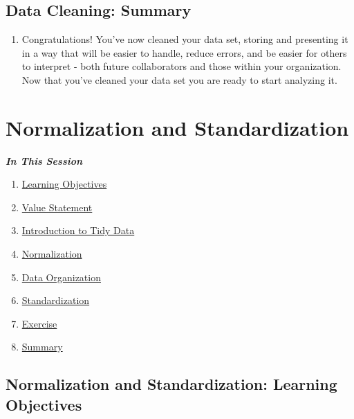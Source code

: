 \documentclass[
]{book}
\providecommand{\tightlist}{%
  \setlength{\itemsep}{0pt}\setlength{\parskip}{0pt}}
\begin{document}
\hypertarget{data-cleaning-summary}{%
\subsection{Data Cleaning: Summary}\label{data-cleaning-summary}}

\begin{enumerate}
\def\labelenumi{\arabic{enumi}.}
\tightlist
\item
  Congratulations! You've now cleaned your data set, storing and presenting it in a way that will be easier to handle, reduce errors, and be easier for others to interpret - both future collaborators and those within your organization. Now that you've cleaned your data set you are ready to start analyzing it.
\end{enumerate}

\hypertarget{normalization-and-standardization}{%
\section{Normalization and Standardization}\label{normalization-and-standardization}}

\textbf{\emph{In This Session}}

\begin{enumerate}
\def\labelenumi{\arabic{enumi}.}
\tightlist
\item
  \protect\hyperlink{normalization-and-standardization-learning-objectives}{Learning Objectives}
\item
  \protect\hyperlink{normalization-and-standardization-value-statement}{Value Statement}
\item
  \protect\hyperlink{introduction-to-tidy-data}{Introduction to Tidy Data}
\item
  \protect\hyperlink{normalization}{Normalization}
\item
  \protect\hyperlink{data-organization}{Data Organization}
\item
  \protect\hyperlink{standardization}{Standardization}
\item
  \protect\hyperlink{exercise}{Exercise}
\item
  \protect\hyperlink{normalization-and-standardization-summary}{Summary}
\end{enumerate}

\hypertarget{normalization-and-standardization-learning-objectives}{%
\subsection{Normalization and Standardization: Learning Objectives}\label{normalization-and-standardization-learning-objectives}}
\end{document}
